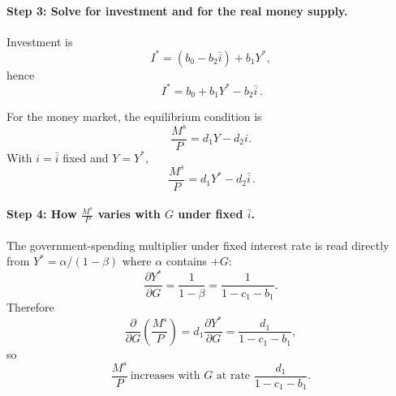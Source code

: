 \documentclass[12pt]{article}
\begin{document}
\paragraph{Step 3: Solve for investment and for the real money supply.}
Investment is
\[
I^* = (b_0-b_2\bar{i}) + b_1Y^*,
\]
hence
\[
\boxed{\,
I^* = b_0 + b_1Y^* - b_2\bar{i}
\, }.
\]

For the money market, the equilibrium condition is
\[
\frac{M^s}{P} = d_1Y - d_2 i.
\]
With \(i=\bar{i}\) fixed and \(Y=Y^*\),
\[
\boxed{\,\frac{M^s}{P} = d_1Y^* - d_2\bar{i}\, }.
\]

\paragraph{Step 4: How \(\frac{M^s}{P}\) varies with \(G\) under fixed \(\bar{i}\).}
The government-spending multiplier under fixed interest rate is read directly from \(Y^*=\alpha/(1-\beta)\) where \(\alpha\) contains \(+G\):
\[
\frac{\partial Y^*}{\partial G}=\frac{1}{1-\beta}=\frac{1}{1-c_1-b_1}.
\]
Therefore
\[
\frac{\partial}{\partial G}\left(\frac{M^s}{P}\right)
= d_1\frac{\partial Y^*}{\partial G}
= \frac{d_1}{1-c_1-b_1},
\]
so
\[
\boxed{\,\frac{M^s}{P}\ \text{increases with }G\text{ at rate }\frac{d_1}{1-c_1-b_1}.\,}
\]
\end{document}
